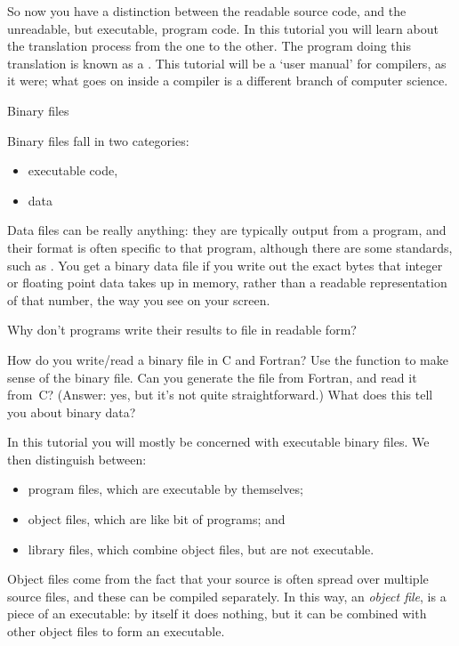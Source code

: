 So now you have
a distinction between the readable source code, and the
unreadable, but executable, program code. In this tutorial you will
learn about the translation process from the one to the other. The
program doing this translation is known as a .
This tutorial will be a `user manual' for compilers, as it were; what
goes on inside a compiler is a different branch of computer science.

 {Binary files}

Binary files fall in two categories:
\begin{itemize}
\item executable code,
\item data
\end{itemize}

Data files can be really anything: they are typically output from
a program, and their format is often specific to that program,
although there are some standards, such as .
You get a binary data file if you write out the exact bytes
that integer or floating point data takes up in memory,
rather than a readable representation of that number,
the way you see on your screen.

\begin{exercise}
  Why don't programs write their results to file in readable form?
\end{exercise}

\begin{enrichment}
  How do you write/read a binary file in C and Fortran?
  Use the function  to make sense
  of the binary file.
  Can you generate the file from Fortran, and read it from~C?
  (Answer: yes, but it's not quite straightforward.)
  What does this tell you about binary data?

\end{enrichment}

In this tutorial you will mostly be concerned with executable binary files.
We then distinguish between:
\begin{itemize}
\item program files, which are executable by themselves;
\item object files, which are like bit of programs; and
\item library files, which combine object files, but are not executable.
\end{itemize}

Object files come from the fact that your source is often spread over multiple
source files, and these can be compiled separately.
In this way, an \emph{object file}, is
a piece of an executable: by itself it does nothing, but
it can be combined with other object files to form an executable.

